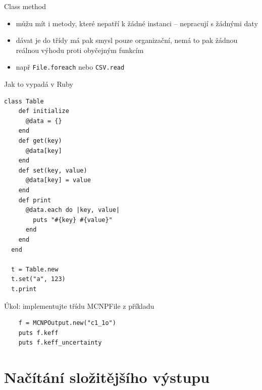 \documentclass{beamer}
\begin{document}
\begin{frame}{Class method}
  \begin{itemize}
    \item můžu mít i metody, které nepatří k žádné instanci – nepracují s žádnými daty
    \item dávat je do třídy má pak smysl pouze organizační, nemá to pak žádnou reálnou výhodu proti obyčejným funkcím
    \item např \texttt{File.foreach} nebo \texttt{CSV.read}
  \end{itemize}
\end{frame}

\begin{frame}[containsverbatim]{Jak to vypadá v Ruby}
  \begin{Verbatim}[fontsize=\tiny]
  class Table
    def initialize
      @data = {}
    end
    def get(key)
      @data[key]
    end
    def set(key, value)
      @data[key] = value
    end
    def print
      @data.each do |key, value|
        puts "#{key} #{value}"
      end
    end
  end

  t = Table.new
  t.set("a", 123)
  t.print
  \end{Verbatim}
\end{frame}

\begin{frame}[containsverbatim]{Úkol: implementujte třídu MCNPFile z příkladu}
  \begin{verbatim}
    f = MCNPOutput.new("c1_1o")
    puts f.keff
    puts f.keff_uncertainty
  \end{verbatim}
\end{frame}

\section{Načítání složitějšího výstupu}
\end{document}
